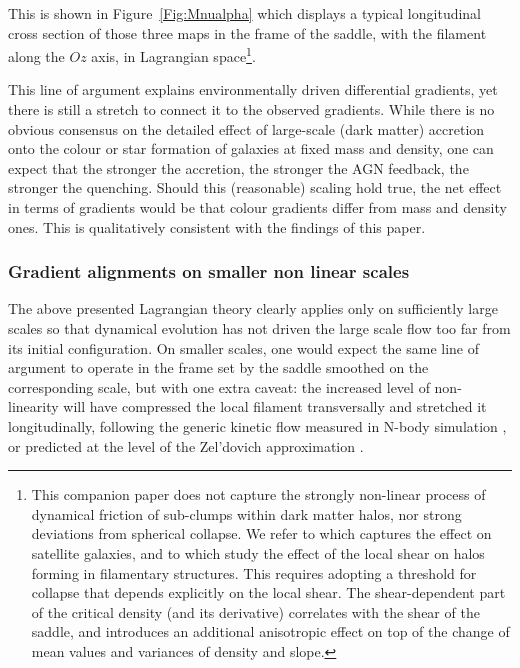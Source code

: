 \documentclass[useAMS,usenatbib]{mnras}
\begin{document}
This is shown in  Figure~\ref{Fig:Mnualpha} which displays a  typical longitudinal cross section of those three maps in the frame of the saddle, with the filament along the $Oz$ axis, in Lagrangian space\footnote{This companion paper does not capture the strongly non-linear process of
dynamical friction of sub-clumps within dark matter halos, nor strong deviations from spherical collapse. We refer to  \cite{Hahn2009} which captures
the effect on satellite galaxies, and to \cite{Ludlow2014,Borzyszkowski2016,2016arXiv161103619C} which study the effect of the local shear on halos forming in filamentary structures.
This requires adopting a threshold for collapse that depends explicitly on the local shear.
The shear-dependent part of the critical density (and its derivative) correlates with the shear of the saddle, and introduces an additional anisotropic effect on top of the change of mean values and variances of density and slope.}.

This line of argument explains environmentally driven differential gradients, yet there is still a stretch to connect it to the observed gradients.
While there is no obvious consensus on the detailed effect of large-scale (dark matter) accretion onto the colour or star formation of galaxies at fixed mass and density, one can expect that the stronger the accretion, the stronger the AGN feedback, the stronger the quenching. Should this (reasonable) scaling hold true, the net effect in terms of gradients would be that colour gradients differ from mass and density ones. This is qualitatively consistent with the findings of this paper.


\subsubsection{Gradient alignments on smaller non linear scales}

The above presented Lagrangian theory clearly applies only on sufficiently large scales so that dynamical evolution has not driven the large scale flow too far from its initial configuration. On smaller scales, one would expect the same line of argument to operate in the frame set by the  saddle smoothed on the corresponding scale, but with one extra caveat: the increased level of non-linearity will have compressed the local filament transversally and stretched  it longitudinally,  following the generic kinetic flow measured in N-body simulation \citep[e.g.,][]{Sousbie2008a}, or predicted at the level of the Zel'dovich approximation \citep{Codis2015}.
\end{document}
